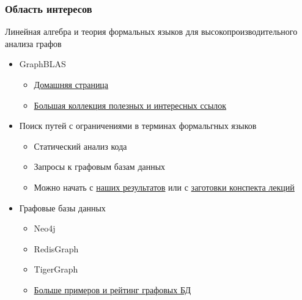 \documentclass[xcolor=table]{beamer}
\begin{document}
\begin{frame}[fragile]

  \frametitle{Область интересов}
  Линейная алгебра и теория формальных языков для высокопроизводительного анализа графов
\begin{itemize}
      \item GraphBLAS
      \begin{itemize}
        \item \href{https://graphblas.github.io/}{Домашняя страница}
        \item \href{https://github.com/GraphBLAS/GraphBLAS-Pointers}{Большая коллекция полезных и интересных ссылок}
      \end{itemize}
      \pause
      \item Поиск путей с ограничениями в терминах формальгных языков
      \begin{itemize}
        \item Статический анализ кода
        \item Запросы к графовым базам данных
        \item Можно начать с \href{https://research.jetbrains.org/groups/plt_lab/projects/cfpq/}{наших результатов} или с \href{https://github.com/YaccConstructor/articles/blob/master/InProgress/Formal_langs_CFPQ_course_notes/Formal_lang_CFPQ_course_notes.pdf}{заготовки конспекта лекций}
      \end{itemize}
      \pause
      \item Графовые базы данных
      \begin{itemize}
        \item Neo4j
        \item RedisGraph
        \item TigerGraph
        \item \href{https://db-engines.com/en/ranking/graph+dbms}{Больше примеров и рейтинг графовых БД}        
      \end{itemize}
\end{itemize}

\end{frame}
\end{document}
